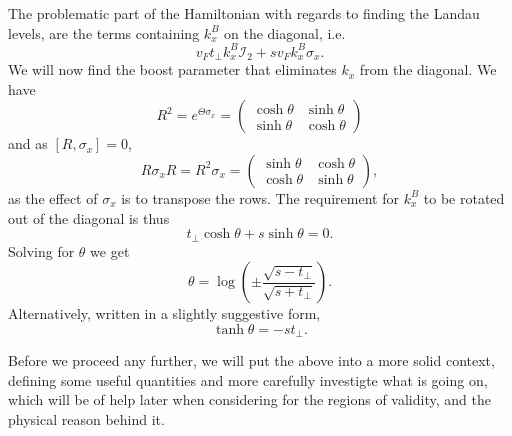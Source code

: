 The problematic part of the Hamiltonian with regards to finding the Landau levels, are the terms containing \(k^B_{x}\) on the diagonal, i.e.
\[
  v_F t_{\perp} k^B_{x} \mathcal{I}_{2} + s v_{F} k^B_{x} \sigma _{x}.
\]
We will now find the boost parameter that eliminates \(k_{x}\) from the diagonal.
We have
\begin{equation}
  \label{eq:39}
  R^{2} = e^{\Theta \sigma _{x} } =
  \begin{pmatrix}
    \cosh \theta & \sinh \theta \\
    \sinh \theta & \cosh \theta
  \end{pmatrix}
\end{equation}
and as $[R, \sigma_{x}] = 0$,
\begin{equation}
  \label{eq:40}
  R \sigma _{x} R =  R^{2} \sigma _{x} =
  \begin{pmatrix}
    \sinh \theta & \cosh \theta \\
    \cosh \theta & \sinh \theta
  \end{pmatrix},
\end{equation}
as the effect of \(\sigma _{x}\) is to transpose the rows.
The requirement for \(k^B_{x}\) to be rotated out of the diagonal is thus
\begin{equation}
  \label{eq:41}
  t_{\perp} \cosh \theta + s \sinh \theta = 0.
\end{equation}
Solving for \(\theta \) we get
\begin{equation}
  \label{eq:42}
  \theta = \log (
  \pm \frac{\sqrt{s - t_{\perp}}}{\sqrt{s + t_{\perp}}}
  ).
\end{equation}
Alternatively, written in a slightly suggestive form,
\begin{equation}
  \label{eq:43}
  \tanh \theta =
  - s t_{\perp}.
\end{equation}

Before we proceed any further, we will put the above into a more solid context, defining some useful quantities and more carefully investigte what is going on, which will be of help later when considering for the regions of validity, and the physical reason behind it.



